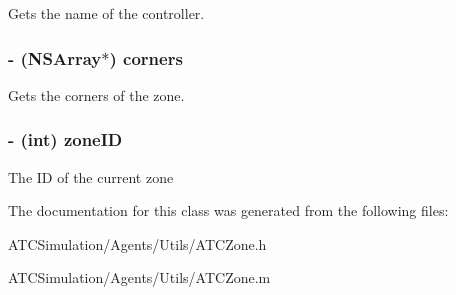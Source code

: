 \label{interface_a_t_c_zone_a3fe3adaf6c79042c465b8be59970316f}
\-Gets the name of the controller. \hypertarget{interface_a_t_c_zone_a2ad0db8ddad83c4c3dfc27b1ec8f6247}{
\subsubsection[{corners}]{\setlength{\rightskip}{0pt plus 5cm}-\/ (\-N\-S\-Array$\ast$) corners}}
\label{interface_a_t_c_zone_a2ad0db8ddad83c4c3dfc27b1ec8f6247}
\-Gets the corners of the zone. \hypertarget{interface_a_t_c_zone_a907a2654ed924fd1dc9b7bb2ffa96d9f}{
\subsubsection[{zone\-I\-D}]{\setlength{\rightskip}{0pt plus 5cm}-\/ (int) zone\-I\-D}}
\label{interface_a_t_c_zone_a907a2654ed924fd1dc9b7bb2ffa96d9f}
\-The \-I\-D of the current zone 

\-The documentation for this class was generated from the following files\-:\begin{DoxyCompactItemize}
\item 
\-A\-T\-C\-Simulation/\-Agents/\-Utils/\-A\-T\-C\-Zone.\-h\item 
\-A\-T\-C\-Simulation/\-Agents/\-Utils/\-A\-T\-C\-Zone.\-m\end{DoxyCompactItemize}
